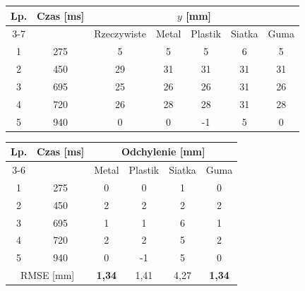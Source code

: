 \begin{tabular}{cc c cccc}
\toprule
Lp. & Czas [ms] & \multicolumn{5}{c}{$y$ [mm]} \\
\cmidrule(lr){3-7}
 &  & Rzeczywiste & Metal & Plastik & Siatka & Guma \\
\midrule
1 & 275 & 5 & 5 & 5 & 6 & 5 \\
2 & 450 & 29 & 31 & 31 & 31 & 31 \\
3 & 695 & 25 & 26 & 26 & 31 & 26 \\
4 & 720 & 26 & 28 & 28 & 31 & 28 \\
5 & 940 & 0 & 0 & -1 & 5 & 0 \\
\bottomrule
\end{tabular}

\bigskip

\begin{tabular}{cc cccc}
\toprule
Lp. & Czas [ms] & \multicolumn{4}{c}{Odchylenie [mm]} \\
\cmidrule(lr){3-6}
 &  & Metal & Plastik & Siatka & Guma \\
\midrule
1 & 275 & 0 & 0 & 1 & 0 \\
2 & 450 & 2 & 2 & 2 & 2 \\
3 & 695 & 1 & 1 & 6 & 1 \\
4 & 720 & 2 & 2 & 5 & 2 \\
5 & 940 & 0 & -1 & 5 & 0 \\
\midrule
\multicolumn{2}{c}{RMSE [mm]} & \textbf{1,34} & 1,41 & 4,27 & \textbf{1,34} \\
\bottomrule
\end{tabular}
